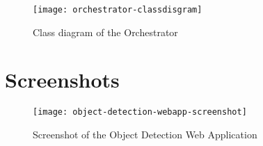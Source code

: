 \begin{figure}[htb]
    \centering
    \texttt{[image: orchestrator-classdisgram]}
    \caption{Class diagram of the Orchestrator}
    \label{fig:orchestrator-classdisgram}
\end{figure}

\clearpage
\chapter{Screenshots\label{cha:appendix-screenshots}}
\begin{figure}[htb]
    \centering
    \texttt{[image: object-detection-webapp-screenshot]}
    \caption{Screenshot of the Object Detection Web Application}
    \label{fig:object-detection-webapp-screenshot}
\end{figure}